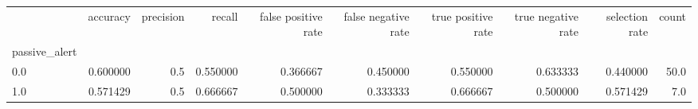 \begin{tabular}{lrrrrrrrrr}
\toprule
{} &  accuracy &  precision &    recall &  false positive rate &  false negative rate &  true positive rate &  true negative rate &  selection rate &  count \\
passive\_alert &           &            &           &                      &                      &                     &                     &                 &        \\
\midrule
0.0           &  0.600000 &        0.5 &  0.550000 &             0.366667 &             0.450000 &            0.550000 &            0.633333 &        0.440000 &   50.0 \\
1.0           &  0.571429 &        0.5 &  0.666667 &             0.500000 &             0.333333 &            0.666667 &            0.500000 &        0.571429 &    7.0 \\
\bottomrule
\end{tabular}
